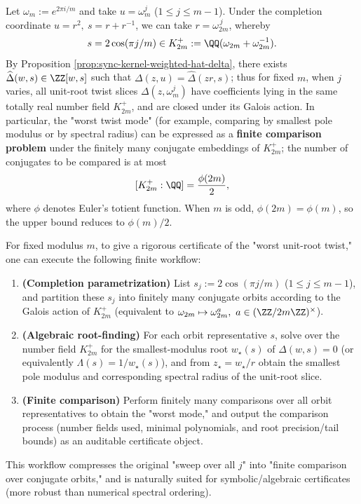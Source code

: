\begin{corollary}\label{cor:sync-kernel-weighted-unit-root-finite}
Let \(\omega_m:=e^{2\pi i/m}\) and take \(u=\omega_m^j\) (\(1\le j\le m-1\)).
Under the completion coordinate \(u=r^2,\ s=r+r^{-1}\), we can take \(r=\omega_{2m}^{\,j}\), whereby
\[
s=2\cos(\pi j/m)\in K_{2m}^+:=\QQ(\omega_{2m}+\omega_{2m}^{-1}).
\]
By Proposition \ref{prop:sync-kernel-weighted-hat-delta}, there exists \(\widehat\Delta(w,s)\in\ZZ[w,s]\) such that
\(
\Delta(z,u)=\widehat\Delta(zr,s)
\);
thus for fixed \(m\), when \(j\) varies, all unit-root twist slices \(\Delta(z,\omega_m^j)\) have coefficients lying in the same totally real number field \(K_{2m}^+\), and are closed under its Galois action.
In particular, the "worst twist mode" (for example, comparing by smallest pole modulus or by spectral radius) can be expressed as a \textbf{finite comparison problem} under the finitely many conjugate embeddings of \(K_{2m}^+\); the number of conjugates to be compared is at most
\[
[K_{2m}^+:\QQ]=\frac{\phi(2m)}{2},
\]
where \(\phi\) denotes Euler's totient function. When \(m\) is odd, \(\phi(2m)=\phi(m)\), so the upper bound reduces to \(\phi(m)/2\).
\end{corollary}

\begin{remark}\label{rem:sync-kernel-weighted-unit-root-finite-bridge}
For fixed modulus \(m\), to give a rigorous certificate of the "worst unit-root twist," one can execute the following finite workflow:
\begin{enumerate}
  \item \textbf{(Completion parametrization)} List \(s_j:=2\cos(\pi j/m)\) (\(1\le j\le m-1\)), and partition these \(s_j\) into finitely many conjugate orbits according to the Galois action of \(K_{2m}^+\) (equivalent to \(\omega_{2m}\mapsto \omega_{2m}^a,\ a\in(\ZZ/2m\ZZ)^\times\)).
  \item \textbf{(Algebraic root-finding)} For each orbit representative \(s\), solve over the number field \(K_{2m}^+\) for the smallest-modulus root \(w_\star(s)\) of \(\widehat\Delta(w,s)=0\) (or equivalently \(\Lambda(s)=1/w_\star(s)\)), and from \(z_\star=w_\star/r\) obtain the smallest pole modulus and corresponding spectral radius of the unit-root slice.
  \item \textbf{(Finite comparison)} Perform finitely many comparisons over all orbit representatives to obtain the "worst mode," and output the comparison process (number fields used, minimal polynomials, and root precision/tail bounds) as an auditable certificate object.
\end{enumerate}
This workflow compresses the original "sweep over all \(j\)" into "finite comparison over conjugate orbits," and is naturally suited for symbolic/algebraic certificates (more robust than numerical spectral ordering).
\end{remark}

